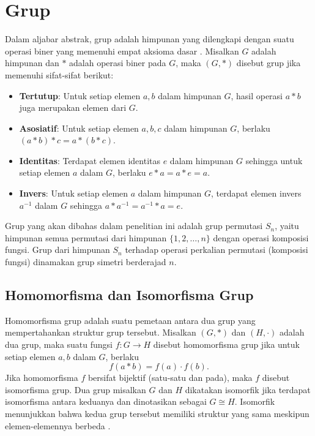 \section{Grup}
Dalam aljabar abstrak, grup adalah himpunan yang dilengkapi dengan suatu operasi biner yang memenuhi empat aksioma dasar \parencite{subiono2022aljabar}. Misalkan $G$ adalah himpunan dan $*$ adalah operasi biner pada $G$, maka $(G, *)$ disebut grup jika memenuhi sifat-sifat berikut:
\begin{itemize}
  \item \textbf{Tertutup}: Untuk setiap elemen $a, b$ dalam himpunan $G$, hasil operasi $a * b$ juga merupakan elemen dari $G$.
  \item \textbf{Asosiatif}: Untuk setiap elemen $a, b, c$ dalam himpunan $G$, berlaku $(a * b) * c = a * (b * c)$.
  \item \textbf{Identitas}: Terdapat elemen identitas $e$ dalam himpunan $G$ sehingga untuk setiap elemen $a$ dalam $G$, berlaku $e * a = a * e = a$.
  \item \textbf{Invers}: Untuk setiap elemen $a$ dalam himpunan $G$, terdapat elemen invers $a^{-1}$ dalam $G$ sehingga $a * a^{-1} = a^{-1} * a = e$.
\end{itemize}
\begin{contoh}
  Grup yang akan dibahas dalam penelitian ini adalah grup permutasi $S_n$, yaitu himpunan semua permutasi dari himpunan $\{1, 2, \ldots, n\}$ dengan operasi komposisi fungsi. Grup dari himpunan $S_n$ terhadap operasi perkalian permutasi (komposisi fungsi) dinamakan
  grup simetri berderajad $n$.
\end{contoh}

\subsection{Homomorfisma dan Isomorfisma Grup}
Homomorfisma grup adalah suatu pemetaan antara dua grup yang mempertahankan struktur grup tersebut. Misalkan $(G, *)$ dan $(H, \cdot)$ adalah dua grup, maka suatu fungsi $f: G \to H$ disebut homomorfisma grup jika untuk setiap elemen $a, b$ dalam $G$, berlaku
\[
  f(a * b) = f(a) \cdot f(b).
\]
Jika homomorfisma $f$ bersifat bijektif (satu-satu dan pada), maka $f$ disebut isomorfisma grup. Dua grup misalkan $G$ dan $H$ dikatakan isomorfik jika terdapat isomorfisma antara keduanya dan dinotasikan sebagai $G\cong H$. Isomorfik menunjukkan bahwa kedua grup tersebut memiliki struktur yang sama meskipun elemen-elemennya berbeda \parencite{subiono2022aljabar}.

